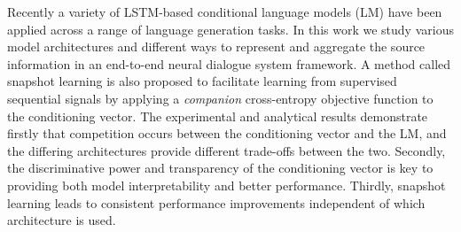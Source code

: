 Recently a variety of LSTM-based conditional language models (LM) have been applied across a range of language generation tasks. In this work we study various model architectures and different ways to represent and aggregate the source information in an end-to-end neural dialogue system framework. A method called snapshot learning is also proposed to facilitate learning from supervised sequential signals by applying a {\it companion} cross-entropy objective function to the conditioning vector. The experimental and analytical results demonstrate firstly that competition occurs between the conditioning vector and the LM, and the differing architectures provide different trade-offs between the two. Secondly, the discriminative power and transparency of the conditioning vector is key to providing both model interpretability and better performance. Thirdly, snapshot learning leads to consistent performance improvements independent of which architecture is used.
